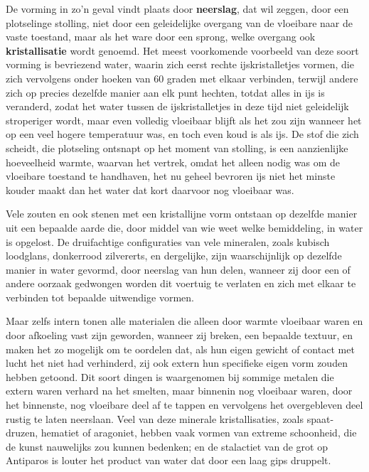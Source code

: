 De vorming in zo'n geval vindt plaats door \textbf{neerslag}, dat wil zeggen, door een plotselinge stolling, niet door een geleidelijke overgang van de vloeibare naar de vaste toestand, maar als het ware door een sprong, welke overgang ook \textbf{kristallisatie} wordt genoemd. Het meest voorkomende voorbeeld van deze soort vorming is bevriezend water, waarin zich eerst rechte ijskristalletjes vormen, die zich vervolgens onder hoeken van 60 graden met elkaar verbinden, terwijl andere zich op precies dezelfde manier aan elk punt hechten, totdat alles in ijs is veranderd, zodat het water tussen de ijskristalletjes in deze tijd niet geleidelijk stroperiger wordt, maar even volledig vloeibaar blijft als het zou zijn wanneer het op een veel hogere temperatuur was, en toch even koud is als ijs. De stof die zich scheidt, die plotseling ontsnapt op het moment van stolling, is een aanzienlijke hoeveelheid warmte, waarvan het vertrek, omdat het alleen nodig was om de vloeibare toestand te handhaven, het nu geheel bevroren ijs niet het minste kouder maakt dan het water dat kort daarvoor nog vloeibaar was.

Vele zouten en ook stenen met een kristallijne vorm ontstaan op dezelfde manier uit een bepaalde aarde die, door middel van wie weet welke bemiddeling, in water is opgelost. De druifachtige configuraties van vele mineralen, zoals kubisch loodglans, donkerrood zilvererts, en dergelijke, zijn waarschijnlijk op dezelfde manier in water gevormd, door neerslag van hun delen, wanneer zij door een of andere oorzaak gedwongen worden dit voertuig te verlaten en zich met elkaar te verbinden tot bepaalde uitwendige vormen.

Maar zelfs intern tonen alle materialen die alleen door warmte vloeibaar waren en door afkoeling vast zijn geworden, wanneer zij breken, een bepaalde textuur, en maken het zo mogelijk om te oordelen dat, als hun eigen gewicht of contact met lucht het niet had verhinderd, zij ook extern hun specifieke eigen vorm zouden hebben getoond. Dit soort dingen is waargenomen bij sommige metalen die extern waren verhard na het smelten, maar binnenin nog vloeibaar waren, door het binnenste, nog vloeibare deel af te tappen en vervolgens het overgebleven deel rustig te laten neerslaan. Veel van deze minerale kristallisaties, zoals spaat-druzen, hematiet of aragoniet, hebben vaak vormen van extreme schoonheid, die de kunst nauwelijks zou kunnen bedenken; en de stalactiet van de grot op Antiparos is louter het product van water dat door een laag gips druppelt.

